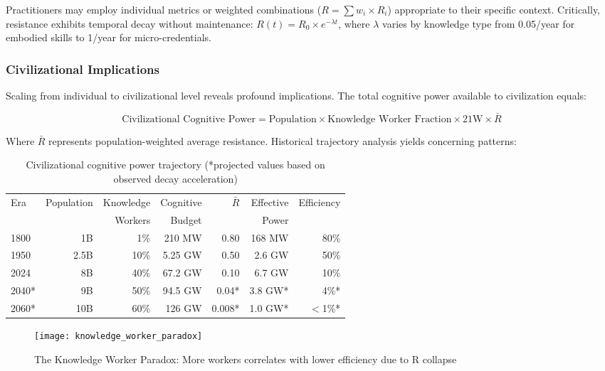 Practitioners may employ individual metrics or weighted combinations ($R = \sum w_i \times R_i$) appropriate to their specific context. Critically, resistance exhibits temporal decay without maintenance: $R(t) = R_0 \times e^{-\lambda t}$, where $\lambda$ varies by knowledge type from 0.05/year for embodied skills to 1/year for micro-credentials.

\subsubsection{Civilizational Implications}

Scaling from individual to civilizational level reveals profound implications. The total cognitive power available to civilization equals:

\begin{equation}
\text{Civilizational Cognitive Power} = \text{Population} \times \text{Knowledge Worker Fraction} \times 21\text{W} \times \bar{R}
\end{equation}

Where $\bar{R}$ represents population-weighted average resistance. Historical trajectory analysis yields concerning patterns:

\begin{table}[h]
\centering
\caption{Civilizational cognitive power trajectory (*projected values based on observed decay acceleration)}
\begin{tabular}{|l|r|r|r|r|r|r|}
\hline
Era & Population & Knowledge & Cognitive & $\bar{R}$ & Effective & Efficiency \\
    &            & Workers   & Budget    &           & Power     &            \\
\hline
1800 & 1B & 1\% & 210 MW & 0.80 & 168 MW & 80\% \\
1950 & 2.5B & 10\% & 5.25 GW & 0.50 & 2.6 GW & 50\% \\
2024 & 8B & 40\% & 67.2 GW & 0.10 & 6.7 GW & 10\% \\
2040* & 9B & 50\% & 94.5 GW & 0.04* & 3.8 GW* & 4\%* \\
2060* & 10B & 60\% & 126 GW & 0.008* & 1.0 GW* & $<$1\%* \\
\hline
\end{tabular}
\end{table}

\begin{figure}[h]
\centering
\texttt{[image: knowledge\_worker\_paradox]}
\caption{The Knowledge Worker Paradox: More workers correlates with lower efficiency due to R collapse}
\label{fig:knowledge_worker_paradox}
\end{figure}

